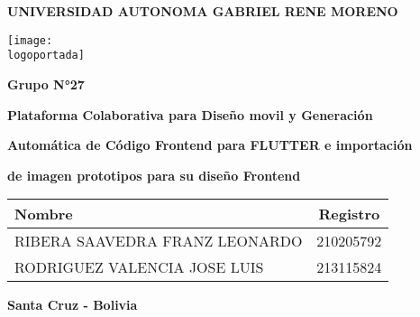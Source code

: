 \documentclass[a4paper]{article} %
\newcommand{\logoportada}{img/Escudo_FICCT.png}
\begin{document}

    \begin{titlepage}
        \centering
        \Large\textbf{UNIVERSIDAD AUTONOMA 
        GABRIEL RENE MORENO}\par\vspace{1.5cm}

        \centering
        \texttt{[image: \\logoportada]}\par\vspace{0.3cm}
        
        {\huge\bfseries\textcolor{titulocolor}{Grupo N°27}}\par\vspace{0.1cm}
        
        \begin{tcolorbox}[colback=red!5!white,colframe=red!75!black]
            \centering
            \Large \textbf{Plataforma Colaborativa para Diseño movil y Generación }\par
            \Large \textbf{Automática de Código Frontend para FLUTTER e importación}\par
            \Large \textbf{de imagen prototipos para su diseño Frontend}\par
        \end{tcolorbox}\par\vspace{1cm}

 
        \hfill  %

                
                \begin{longtable}[c]{|l|c|}
                    \hline
                    \rowcolor{bleudefrance} \color{aliceblue}\textbf{Nombre} & \color{aliceblue}\textbf{Registro} \\
                    \hline
                    \endfirsthead
                    
                    
                    \hline

                                            {RIBERA SAAVEDRA FRANZ LEONARDO} &  {210205792} \\
                    \rowcolor{lightblue}    {RODRIGUEZ VALENCIA JOSE LUIS} &    {213115824} \\

                    \hline

                    \end{longtable}


        \vspace{1cm}  %
        \Large\textbf{Santa Cruz - Bolivia}\par

    \end{titlepage}
\end{document}
